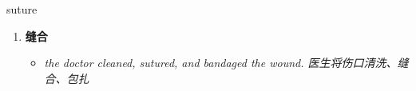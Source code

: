 
\begin{frame}
{\huge suture}
\begin{center}
\begin{enumerate}\Large
  \item \textbf{缝合}
  \begin{itemize}
    \item \em{\Large{the doctor cleaned, sutured, and bandaged the wound. 医生将伤口清洗、缝合、包扎}}
  \end{itemize}
\end{enumerate}
\end{center}
\end{frame}
